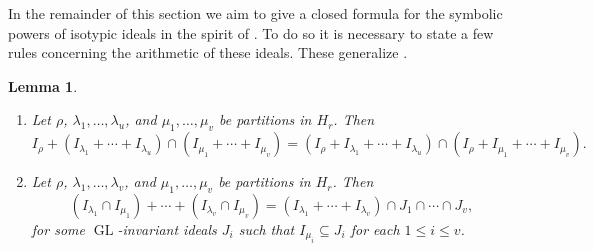 \documentclass[11pt, reqno]{amsart}
\numberwithin{equation}{section}
\newtheorem{lemma}[theorem]{Lemma}
\theoremstyle{definition}
\DeclareMathOperator{\GL}{GL}
\begin{document}
In the remainder of this section we aim to give a closed formula for the symbolic powers of isotypic ideals in the spirit of . To do so it is necessary to state a few rules concerning the arithmetic of these ideals. These generalize \cite[Lemmas~7.4 and 7.5]{WhiteheadThesis}.

\begin{lemma}\label{lemma: sum and intersection}
\begin{enumerate}
\item
Let $\rho$, $\lambda_1,\dots,\lambda_u$, and $\mu_1,\dots,\mu_v$ be partitions in $H_r$. Then
\[
I_\rho+(I_{\lambda_1}+\cdots+I_{\lambda_u})\cap(I_{\mu_1}+\cdots+I_{\mu_v})
=
(I_\rho+I_{\lambda_1}+\cdots+I_{\lambda_u})\cap(I_\rho+I_{\mu_1}+\cdots+I_{\mu_v}).
\]
\item
Let $\rho$, $\lambda_1,\dots,\lambda_v$, and $\mu_1,\dots,\mu_v$ be partitions in $H_r$. Then
\[
(I_{\lambda_1}\cap I_{\mu_1})+\cdots+(I_{\lambda_v}\cap I_{\mu_v})
=(I_{\lambda_1}+\cdots+I_{\lambda_v})\cap J_1\cap\cdots\cap J_v,
\]
for some $\GL$-invariant ideals $J_i$ such that
 $I_{\mu_i}\subseteq J_i$ for each $1\leq i\leq v$.
\end{enumerate}
\end{lemma}
\end{document}
